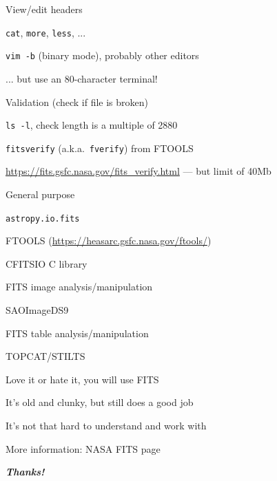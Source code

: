 \documentclass[20pt,landscape]{foils}
\newif\ifrubric
\newcommand{\burl}[1]{{\color{blue}\url{#1}}}
\begin{document}
\begin{list1}
  \item View/edit headers
  \begin{list2}
    \item {\color{brown}\tt cat},
          {\color{brown}\tt more},
          {\color{brown}\tt less}, ...
    \item {\color{brown}\tt vim -b} (binary mode), probably other editors
    \item[] \hspace*{1em} ... but use an 80-character terminal!
  \end{list2}
  \item Validation (check if file is broken)
  \begin{list2}
    \item {\color{brown}\tt ls -l}, check length is a multiple of 2880
    \item {\color{brown}\tt fitsverify} (a.k.a.\ {\color{brown}\tt fverify})
          from FTOOLS
    \item \burl{https://fits.gsfc.nasa.gov/fits_verify.html}
          --- but limit of 40Mb
  \end{list2}
  \item General purpose
  \begin{list2}
    \item {\tt astropy.io.fits}
    \item FTOOLS (\burl{https://heasarc.gsfc.nasa.gov/ftools/})
    \item CFITSIO C library
  \end{list2}
  \item FITS image analysis/manipulation
  \begin{list2}
    \item SAOImageDS9
  \end{list2}
  \item FITS table analysis/manipulation
  \begin{list2}
    \item TOPCAT/STILTS
  \end{list2}
\end{list1}


\begin{list1}
  \item Love it or hate it, you will use FITS
  \item It's old and clunky, but still does a good job
  \item It's not that hard to understand and work with
  \item More information: NASA FITS page
\end{list1}

\vspace{6cm}
\begin{center}
  {\color{darkred}\Huge\bf\sl Thanks!}
\end{center}

\label{lastPage}

\ifrubric

\newcommand{\aobSlide}[1]{
\newpage
\rightfooter{}
\MyLogo{}
\begin{picture}(30,0)
  #1
\end{picture}
\bigword{AOB?}
}
\aobSlide{}

\fi
\end{document}
